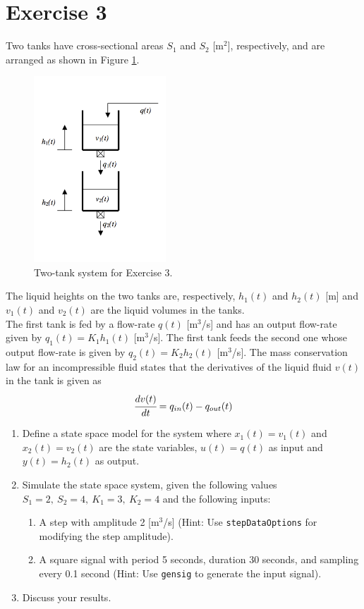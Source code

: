 \documentclass[a4paper,11pt]{article}
\begin{document}
\section*{Exercise 3} 
Two tanks have cross-sectional areas $S_1$ and $S_2$ [m$^2$], respectively, and are arranged as shown in Figure \ref{fig:ex3}. 
\begin{figure}[ht!]
\begin{center}\includegraphics[width=0.44\textwidth]{Figures/tanks_ex} \end{center}
 \vskip-0.5cm\caption{Two-tank system for Exercise 3.}
\label{fig:ex3}
\end{figure}

\noindent The liquid heights on the two tanks are, respectively, $h_1(t)$ and $h_2(t)$ [m] and $v_1(t)$ and $v_2(t)$ are the liquid volumes in the tanks. \\

\noindent The first tank is fed by a flow-rate $q(t)$ [m$^3$/s] and has an output flow-rate given by $q_1(t)=K_1h_1(t)$ [m$^3$/s]. The first tank feeds the second one whose output flow-rate is given by $q_2(t)=K_2h_2(t)$ [m$^3$/s]. The mass conservation law for an incompressible fluid states that the derivatives of the liquid fluid $v(t)$ in the tank is given as
\begin{equation*} 
\cfrac{dv(t)}{dt}=q_{in}(t)-q_{out}(t)
\end{equation*}

\begin{enumerate}
\item Define a state space model for the system where $x_1(t)=v_1(t)$ and $x_2(t)=v_2(t)$ are the state variables, $u(t)=q(t)$ as input and $y(t)=h_2(t)$ as output. 
\item Simulate the state space system, given the following values $S_1=2, \ S_2=4, \ K_1=3, \ K_2=4$ and the following inputs:
\begin{enumerate}
\item A step with amplitude 2 [m$^3$/s] (Hint: Use {\tt stepDataOptions} for modifying the step amplitude). 
\item A square signal with period 5 seconds, duration 30 seconds, and sampling every 0.1 second (Hint: Use {\tt gensig} to generate the input signal).
\end{enumerate}
\item Discuss your results.
\end{enumerate}
\end{document}
